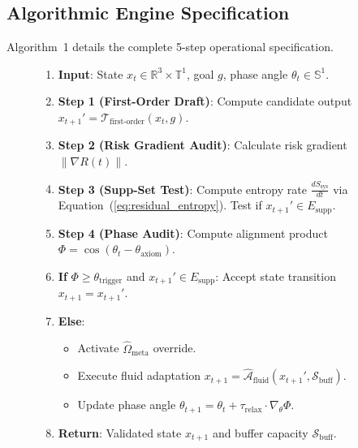 \documentclass[journal,twocolumn,10pt]{IEEEtran}
\begin{document}
\subsection{Algorithmic Engine Specification}
Algorithm~1 details the complete 5-step operational specification.

\begin{figure}[htbp]
\centering
\begin{tcolorbox}[width=\columnwidth,colback=gray!5!white,colframe=blue!75!black,title=\textbf{Algorithm 1: Holographic Metacognitive Control Engine}]
\small
\begin{enumerate}
    \item \textbf{Input}: State $x_t \in \mathbb{R}^3 \times \mathbb{T}^1$, goal $g$, phase angle $\theta_t \in \mathbb{S}^1$.
    \item \textbf{Step 1 (First-Order Draft)}: Compute candidate output $x_{t+1}' = \mathcal{T}_{\text{first-order}}(x_t, g)$.
    \item \textbf{Step 2 (Risk Gradient Audit)}: Calculate risk gradient $\|\nabla R(t)\|$.
    \item \textbf{Step 3 (Supp-Set Test)}: Compute entropy rate $\frac{dS_{\text{sys}}}{dt}$ via Equation~(\ref{eq:residual_entropy}). Test if $x_{t+1}' \in E_{\text{supp}}$.
    \item \textbf{Step 4 (Phase Audit)}: Compute alignment product $\Phi = \cos(\theta_t - \theta_{\text{axiom}})$.
    \item \textbf{If} $\Phi \ge \theta_{\text{trigger}}$ and $x_{t+1}' \in E_{\text{supp}}$: Accept state transition $x_{t+1} = x_{t+1}'$.
    \item \textbf{Else}:
    \begin{itemize}
        \item Activate $\hat{\Omega}_{\text{meta}}$ override.
        \item Execute fluid adaptation $x_{t+1} = \hat{\mathcal{A}}_{\text{fluid}}(x_{t+1}', \mathcal{S}_{\text{buff}})$.
        \item Update phase angle $\theta_{t+1} = \theta_t + \tau_{\text{relax}} \cdot \nabla_\theta \Phi$.
    \end{itemize}
    \item \textbf{Return}: Validated state $x_{t+1}$ and buffer capacity $\mathcal{S}_{\text{buff}}$.
\end{enumerate}
\end{tcolorbox}
\end{figure}
\end{document}
